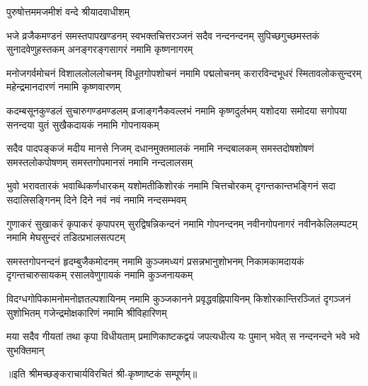 
{पुरुषोत्तममजमीशं वन्दे श्रीयादवाधीशम्}

\fourlineindentedshloka
{भजे व्रजैकमण्डनं समस्तपापखण्डनम्}
{स्वभक्तचित्तरञ्जनं सदैव नन्दनन्दनम्}
{सुपिच्छगुच्छमस्तकं सुनादवेणुहस्तकम्}
{अनङ्गरङ्गसागरं नमामि कृष्णनागरम्}

\fourlineindentedshloka
{मनोजगर्वमोचनं विशाललोललोचनम्}
{विधूतगोपशोचनं नमामि पद्मलोचनम्}
{करारविन्दभूधरं स्मितावलोकसुन्दरम्}
{महेन्द्रमानदारणं नमामि कृष्णवारणम्}

\fourlineindentedshloka
{कदम्बसूनकुण्डलं सुचारुगण्डमण्डलम्}
{व्रजाङ्गनैकवल्लभं नमामि कृष्णदुर्लभम्}
{यशोदया समोदया सगोपया सनन्दया}
{युतं सुखैकदायकं नमामि गोपनायकम्}

\fourlineindentedshloka
{सदैव पादपङ्कजं मदीय मानसे निजम्}
{दधानमुक्तमालकं नमामि नन्दबालकम्}
{समस्तदोषशोषणं समस्तलोकपोषणम्}
{समस्तगोपमानसं नमामि नन्दलालसम्}

\fourlineindentedshloka
{भुवो भरावतारकं भवाब्धिकर्णधारकम्}
{यशोमतीकिशोरकं नमामि चित्तचोरकम्}
{दृगन्तकान्तभङ्गिनं सदा सदालिसङ्गिनम्}
{दिने दिने नवं नवं नमामि नन्दसम्भवम्}

\fourlineindentedshloka
{गुणाकरं सुखाकरं कृपाकरं कृपापरम्}
{सुरद्विषन्निकन्दनं नमामि गोपनन्दनम्}
{नवीनगोपनागरं नवीनकेलिलम्पटम्}
{नमामि मेघसुन्दरं तडित्प्रभालसत्पटम्}

\fourlineindentedshloka
{समस्तगोपनन्दनं हृदम्बुजैकमोदनम्}
{नमामि कुञ्जमध्यगं प्रसन्नभानुशोभनम्}
{निकामकामदायकं दृगन्तचारुसायकम्}
{रसालवेणुगायकं नमामि कुञ्जनायकम्}

\fourlineindentedshloka
{विदग्धगोपिकामनोमनोज्ञतल्पशायिनम्}
{नमामि कुञ्जकानने प्रवृद्धवह्निपायिनम्}
{किशोरकान्तिरञ्जितं दृगञ्जनं सुशोभितम्}
{गजेन्द्रमोक्षकारिणं नमामि श्रीविहारिणम्}

{मया सदैव गीयतां तथा कृपा विधीयताम्}
{प्रमाणिकाष्टकद्वयं जपत्यधीत्य यः पुमान्}
{भवेत् स नन्दनन्दने भवे भवे सुभक्तिमान्}

॥इति श्रीमच्छङ्कराचार्यविरचितं श्री-कृष्णाष्टकं सम्पूर्णम्॥